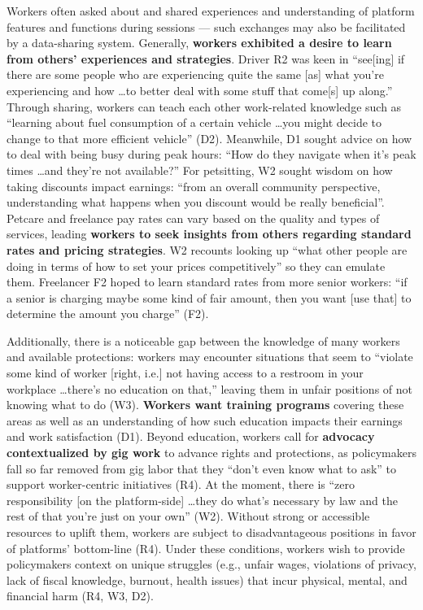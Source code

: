 Workers often asked about and shared experiences and understanding of platform features and functions during sessions --- such exchanges may also be facilitated by a data-sharing system. 
Generally, \textbf{workers exhibited a desire to learn from others' experiences and strategies}. Driver R2 was keen in ``see[ing] if there are some people who are experiencing quite the same [as] what you're experiencing and how  \dots  to better deal with some stuff that come[s] up along.'' Through sharing, workers can teach each other work-related knowledge such as ``learning about fuel consumption of a certain vehicle \dots you might decide to change to that more efficient vehicle'' (D2). Meanwhile, D1 sought advice on how to deal with being busy during peak hours: ``How do they navigate when it's peak times  \dots  and they're not available?'' For petsitting, W2 sought wisdom on how taking discounts impact earnings: ``from an overall community perspective, understanding what happens when you discount would be really beneficial''. Petcare and freelance pay rates can vary based on the quality and types of services, leading \textbf{workers to seek insights from others regarding standard rates and pricing strategies}. W2 recounts looking up ``what other people are doing in terms of how to set your prices competitively'' so they can emulate them. Freelancer F2 hoped to learn standard rates from more senior workers: ``if a senior is charging maybe some kind of fair amount, then you want [use that] to determine the amount you charge'' (F2).  

Additionally, there is a noticeable gap between the knowledge of many workers and available protections: workers may encounter situations that seem to ``violate some kind of worker [right, i.e.] not having access to a restroom in your workplace \dots there's no education on that,'' leaving them in unfair positions of not knowing what to do (W3).
\textbf{Workers want training programs} covering these areas as well as an understanding of how such education impacts their earnings and work satisfaction (D1).
Beyond education, workers call for \textbf{advocacy contextualized by gig work} to advance rights and protections, as policymakers fall so far removed from gig labor that they ``don't even know what to ask'' to support worker-centric initiatives (R4). At the moment, there is ``zero responsibility [on the platform-side] \dots they do what's necessary by law and the rest of that you're just on your own'' (W2). Without strong or accessible resources to uplift them, workers are subject to disadvantageous positions in favor of platforms' bottom-line (R4). Under these conditions, workers wish to provide policymakers context on unique struggles (e.g., unfair wages, violations of privacy, lack of fiscal knowledge, burnout, health issues) that incur physical, mental, and financial harm (R4, W3, D2). 


